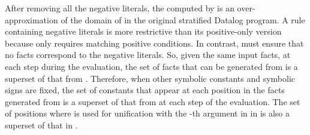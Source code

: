 After removing all the negative literals, the  computed by \code{[Dom]} is an over-approximation of the domain of \code{\alpha} in the original stratified Datalog program.
A rule \code{\drule} containing negative literals is more restrictive than its positive-only version  
because  only requires matching positive conditions. In contrast, \code{\drule} must ensure that no facts correspond to the negative literals. 
So, given the same input facts, at each step during the evaluation, the set of facts that can be generated from  is a superset of that from \code{\drule^{*}}.
Therefore, when other symbolic constants and symbolic signs are fixed, the set of constants that appear at each position 
in the facts generated from  is a superset of that from \code{\drule^{*}} at each step of the evaluation.
The set of positions  where \code{\alpha} is used for unification with the \code{\ijk}-th argument in  in  is also a superset of that in \code{\drule^{*}}.
